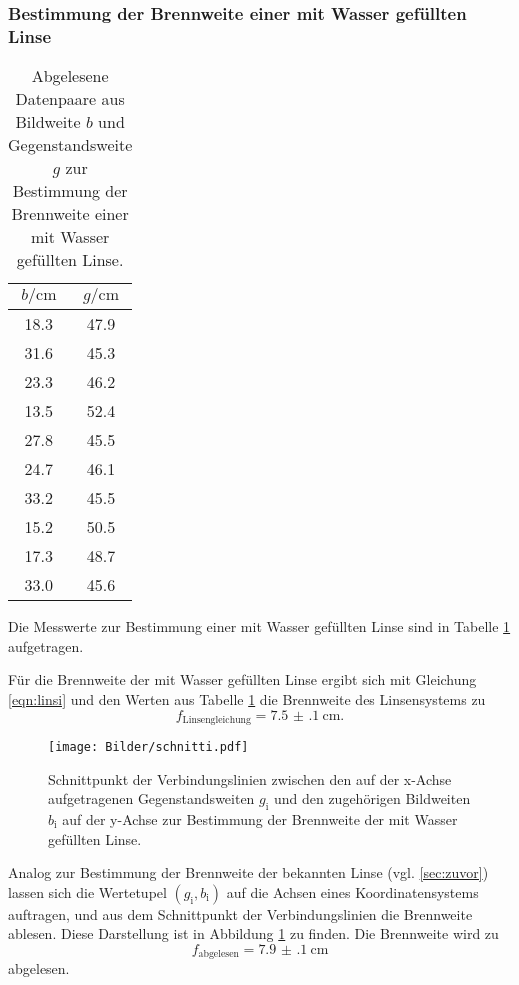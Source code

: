\FloatBarrier
\subsubsection{Bestimmung der Brennweite einer mit Wasser gefüllten Linse}


\begin{table}
	\caption{Abgelesene Datenpaare aus Bildweite $b$ und Gegenstandsweite $g$ zur Bestimmung der Brennweite einer mit Wasser gefüllten Linse.}
	\label{tab:hquer}
	\centering
	\begin{tabular}{cc}
		\toprule
		$b/\si{\centi\meter}$ & $g/\si{\centi\meter}$ \\
	\midrule
		18.3 & 47.9 \\
		31.6 & 45.3 \\
		23.3 & 46.2 \\
		13.5 & 52.4 \\
		27.8 & 45.5 \\
		24.7 & 46.1 \\
		33.2 & 45.5 \\
		15.2 & 50.5 \\
		17.3 & 48.7 \\
		33.0 & 45.6 \\
	\bottomrule
	\end{tabular}
\end{table}
	
Die Messwerte zur Bestimmung einer mit Wasser gefüllten Linse sind in Tabelle \ref{tab:hquer}
aufgetragen.

Für die Brennweite der mit Wasser gefüllten Linse ergibt sich mit Gleichung \eqref{eqn:linsi}
und den Werten aus Tabelle \ref{tab:hquer} die Brennweite des Linsensystems zu 
\begin{equation*}
	f_{\mathrm{Linsengleichung}} = \SI{7.5(1)}{\centi\meter} \mathrm{.}
\end{equation*}

\begin{figure}
  \centering
  \texttt{[image: Bilder/schnitti.pdf]}
  \caption{Schnittpunkt der Verbindungslinien zwischen den auf der x-Achse aufgetragenen Gegenstandsweiten $g_\mathrm{i}$ und den zugehörigen Bildweiten $b_\mathrm{i}$ auf der y-Achse zur Bestimmung der Brennweite der mit Wasser gefüllten Linse.}
  \label{fig:kopiert}
\end{figure}


Analog zur Bestimmung der Brennweite der bekannten Linse (vgl. \ref{sec:zuvor}) lassen sich 
die Wertetupel $(g_{\mathrm{i}}, b_{\mathrm{i}})$ auf die Achsen eines Koordinatensystems 
auftragen, und aus dem Schnittpunkt der Verbindungslinien die Brennweite ablesen.
Diese Darstellung  ist in Abbildung \ref{fig:kopiert} zu finden.
Die Brennweite wird zu
\begin{equation*}
	f_{\mathrm{abgelesen}} = \SI{7.9(1)}{\centi\meter}
\end{equation*}
abgelesen.





